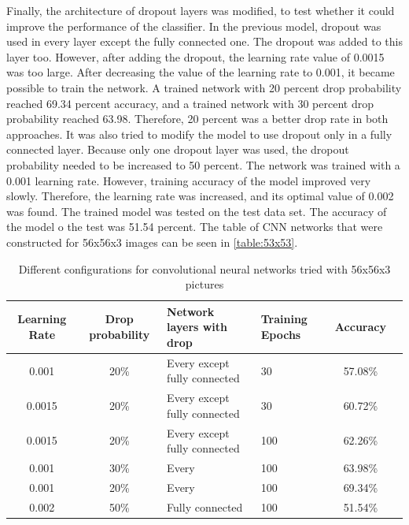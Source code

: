 Finally, the architecture of dropout layers was modified, to test whether it could improve the performance of the classifier. In the previous model, dropout was used in every layer except the fully connected one. The dropout was added to this layer too. However, after adding the dropout, the learning rate value of 0.0015 was too large. After decreasing the value of the learning rate to 0.001, it became possible to train the network. A trained network with 20 percent drop probability reached 69.34 percent accuracy, and a trained network with 30 percent drop probability reached 63.98. Therefore, 20 percent was a better drop rate in both approaches. It was also tried to modify the model to use dropout only in a fully connected layer. Because only one dropout layer was used, the dropout probability needed to be increased to 50 percent. The network was trained with a 0.001 learning rate. However, training accuracy of the model improved very slowly. Therefore, the learning rate was increased, and its optimal value of 0.002 was found. The trained model was tested on the test data set. The accuracy of the model o the test was 51.54 percent. The table of CNN networks that were constructed for 56x56x3 images can be seen in \autoref{table:53x53}.


\begin{table}[h]
\begin{center}
\begin{tabular}{ |c|c|p{3.3 cm}|p{2 cm}|c|c|} 
 \hline
 Learning Rate & Drop probability & Network layers with drop &Training Epochs&Accuracy \\   \hline
0.001   &   20\%  & Every except fully  connected  & 30 & 57.08\% \\ \hline
0.0015    &   20\%   &  Every  except fully connected  & 30  & 60.72\% \\ \hline
0.0015    &   20\%   &  Every  except fully connected  & 100  & 62.26\% \\ \hline
0.001    &   30\%   &  Every  & 100  & 63.98\% \\ \hline
0.001    &   20\%   &  Every  & 100  & 69.34\% \\ \hline
0.002    &   50\%   &  Fully connected& 100  & 51.54\% \\  \hline
\end{tabular}
\caption{Different configurations for convolutional neural networks tried with 56x56x3 pictures}
\label{table:53x53}
\end{center}
\end{table}



